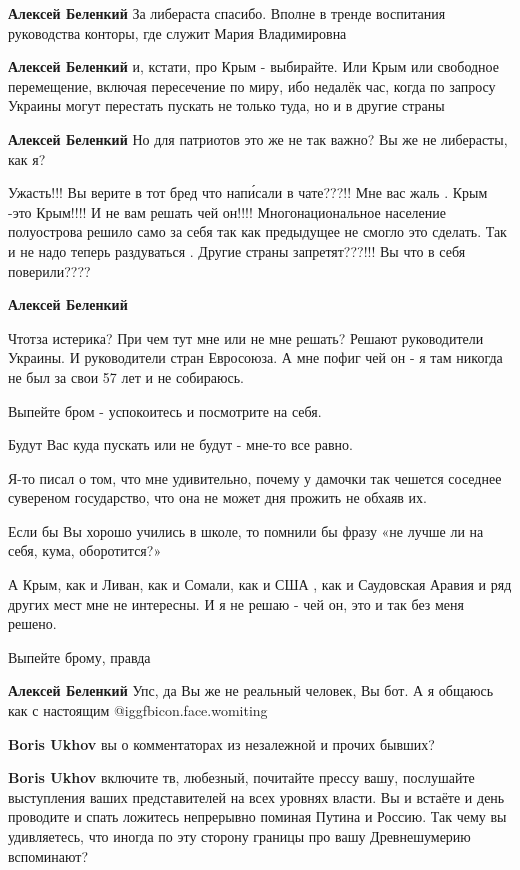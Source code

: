 \begin{itemize}
\begin{itemize}
\textbf{Алексей Беленкий} За либераста спасибо. Вполне в тренде воспитания руководства конторы, где служит Мария Владимировна

\textbf{Алексей Беленкий} и, кстати, про Крым - выбирайте. Или Крым или свободное перемещение, включая пересечение по миру, ибо недалёк час, когда по запросу Украины могут перестать пускать не только туда, но и в другие страны

\textbf{Алексей Беленкий} Но для патриотов это же не так важно? Вы же не либерасты, как я?


Ужасть!!! Вы верите в тот бред что напи́сали в чате???!! Мне вас жаль . Крым
-это Крым!!!! И не вам решать чей он!!!! Многонациональное население
полуострова решило само за себя так как предыдущее не смогло это сделать. Так и
не надо теперь раздуваться . Другие страны запретят???!!! Вы что в себя
поверили????

\textbf{Алексей Беленкий} 

Чтотза истерика? При чем тут мне или не мне решать? Решают руководители
Украины. И руководители стран Евросоюза. А мне пофиг чей он - я там никогда не
был за свои 57 лет и не собираюсь.

Выпейте бром - успокоитесь и посмотрите на себя.

Будут Вас куда пускать или не будут - мне-то все равно.

Я-то писал о том, что мне удивительно, почему у дамочки так чешется соседнее
сувереном государство, что она не может дня прожить не обхаяв их.

Если бы Вы хорошо учились в школе, то помнили бы фразу «не лучше ли на себя,
кума, оборотится?»

А Крым, как и Ливан, как и Сомали, как и США , как и Саудовская Аравия и ряд
других мест мне не интересны. И я не решаю - чей он, это и так без меня решено.

Выпейте брому, правда

\textbf{Алексей Беленкий} Упс, да Вы же не реальный человек, Вы бот. А я общаюсь как с настоящим @igg{fbicon.face.womiting} 

\textbf{Boris Ukhov} вы о комментаторах из незалежной и прочих бывших?

\textbf{Boris Ukhov} включите тв, любезный, почитайте прессу вашу, послушайте выступления ваших представителей на всех уровнях власти. Вы и встаёте и день проводите и спать ложитесь непрерывно поминая Путина и Россию. Так чему вы удивляетесь, что иногда по эту сторону границы про вашу Древнешумерию вспоминают?


\end{itemize}
\end{itemize}
